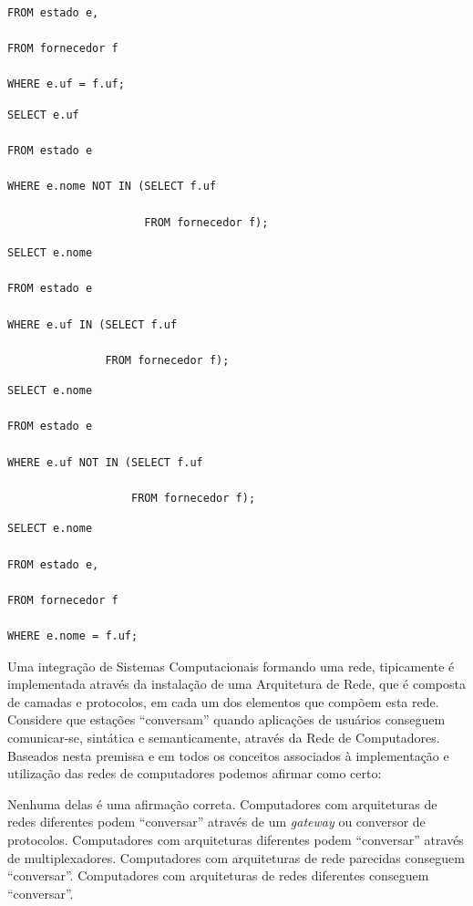 \documentclass[12pt, addpoints]{exam}
\begin{document}
\begin{questions}
\begin{choices}
\begin{verbatim}
FROM estado e,

FROM fornecedor f

WHERE e.uf = f.uf;

\end{verbatim}


\choice \begin{verbatim}SELECT e.uf

FROM estado e

WHERE e.nome NOT IN (SELECT f.uf

                     FROM fornecedor f);

\end{verbatim}
\choice \begin{verbatim}SELECT e.nome

FROM estado e

WHERE e.uf IN (SELECT f.uf

               FROM fornecedor f);

\end{verbatim}


\choice \begin{verbatim}SELECT e.nome

FROM estado e

WHERE e.uf NOT IN (SELECT f.uf

                   FROM fornecedor f);

\end{verbatim}


\choice \begin{verbatim}SELECT e.nome

FROM estado e,

FROM fornecedor f

WHERE e.nome = f.uf;

\end{verbatim}


\end{choices}

\question

Uma integração de Sistemas Computacionais formando uma rede, tipicamente é implementada através da instalação de uma Arquitetura de Rede, que é composta de camadas e protocolos, em cada um dos elementos que compõem esta rede. Considere que estações “conversam” quando aplicações de usuários conseguem comunicar-se, sintática e semanticamente, através da Rede de Computadores. Baseados nesta premissa e em todos os conceitos associados à implementação e utilização das redes de computadores podemos afirmar como certo:


\begin{choices}
\choice Nenhuma delas é uma afirmação correta.
\choice Computadores com arquiteturas de redes diferentes podem “conversar” através de um \textit{gateway} ou conversor de protocolos.
\choice Computadores com arquiteturas diferentes podem “conversar” através de multiplexadores.
\choice Computadores com arquiteturas de rede parecidas conseguem “conversar”.
\choice Computadores com arquiteturas de redes diferentes conseguem “conversar”.
\end{choices}


\end{questions}
\end{document}
